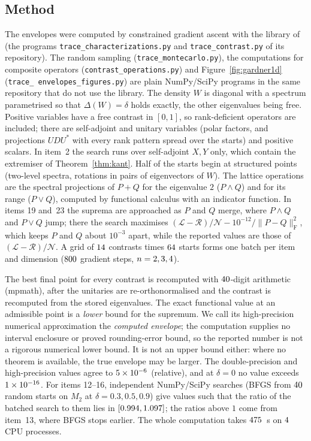 \documentclass[11pt]{article}
\newcommand{\cL}{\mathcal{L}}
\newcommand{\cR}{\mathcal{R}}
\newcommand{\cN}{\mathcal{N}}
\theoremstyle{plain}
\theoremstyle{definition}
\theoremstyle{remark}
\begin{document}
\subsection{Method}\label{sec:method}
The envelopes were computed by constrained gradient ascent with the library of~\cite{lib} (the programs
\texttt{trace\_\allowbreak characterizations.py} and \texttt{trace\_\allowbreak contrast.py} of its repository). The
random sampling (\texttt{trace\_\allowbreak montecarlo.py}), the computations for composite operators
(\texttt{contrast\_\allowbreak operations.py}) and Figure~\ref{fig:gardner1d} (\texttt{trace\_\allowbreak
envelopes\_\allowbreak figures.py}) are plain NumPy/SciPy programs in the same repository that do not use the library.
The density $W$ is diagonal with a spectrum parametrised so that $\Delta(W)=\delta$
holds exactly, the other eigenvalues being free. Positive variables have a free contrast in $[0,1]$, so rank-deficient
operators are included; there are self-adjoint and unitary variables (polar factors, and projections $UDU^*$ with every rank
pattern spread over the starts) and positive scalars. In item~2 the search runs over self-adjoint $X,Y$ only, which
contain the extremiser of Theorem~\ref{thm:kant}. Half of the starts begin at structured points (two-level spectra,
rotations in pairs of eigenvectors of $W$). The lattice operations are the spectral projections of $P+Q$ for the
eigenvalue $2$ ($P\wedge Q$) and for its range ($P\vee Q$), computed by functional calculus with an indicator function. In
items 19 and~23 the suprema are approached as $P$ and $Q$ merge, where $P\wedge Q$ and $P\vee Q$ jump; there the search
maximises $(\cL-\cR)/\cN-10^{-12}/\|P-Q\|_{\mathrm F}^2$, which keeps $P$ and $Q$ about $10^{-3}$ apart, while the reported
values are those of $(\cL-\cR)/\cN$. A grid of $14$ contrasts times $64$ starts forms one batch per item
and dimension ($800$ gradient steps, $n=2, 3, 4$).

The best final point for every contrast is recomputed with $40$-digit arithmetic (mpmath), after the unitaries
are re-orthonormalised and the contrast is recomputed from the stored eigenvalues. The exact functional value at an
admissible point is a \emph{lower} bound for the supremum. We call its high-precision numerical approximation the
\emph{computed envelope}; the computation supplies no interval enclosure or proved rounding-error bound, so the
reported number is not a rigorous numerical lower bound. It is not an upper bound either: where no theorem is
available, the true envelope may be larger. The
double-precision and high-precision values agree to $5\times10^{-6}$ (relative), and at $\delta=0$ no value exceeds
$1\times10^{-16}$. For items 12--16, independent NumPy/SciPy searches (BFGS from $40$ random starts on $M_2$ at
$\delta=0.3,0.5,0.9$) give values such that the ratio of the batched search to them lies in
$[0.994,1.097]$; the ratios above $1$ come from item~13, where BFGS stops earlier. The whole computation takes $475$~s on $4$ CPU processes.
\end{document}
